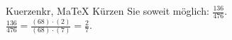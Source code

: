 \begin{MAufgabe}{Kuerzen}{kr, MaTeX}
K\"urzen Sie soweit m\"oglich: $\frac{136}{476}$.\\ 
\ifLsg\MLoesung
\quad $\frac{136}{476}=\frac{(68)\cdot(2)}{(68)\cdot(7)}=\frac{2}{7}$.\else\relax\fi
 \end{MAufgabe}